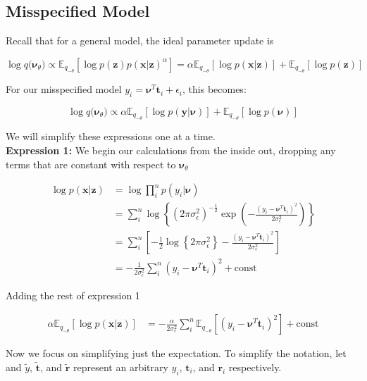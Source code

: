 \documentclass[letterpaper,12pt]{article}
\newcommand{\lc}{\left \{} %
\newcommand{\rc}{\right \}} %
\newcommand{\lp}{\left (} %
\newcommand{\rp}{\right )} %
\newcommand{\lb}{\left [} %
\newcommand{\rb}{\right ]} %
\newcommand{\pz}{\ensuremath{p(\boldsymbol{z})}}
\newcommand{\pxgivenz}{\ensuremath{p(\boldsymbol{x} | \boldsymbol{z})}}
\newcommand{\sigmaepsilon}{\sigma_\epsilon^2} %
\newcommand{\nuv}{\boldsymbol{\nu}} %
\newcommand{\ti}{\boldsymbol{t}_i} %
\newcommand{\ri}{\boldsymbol{r}_i} %
\newcommand{\ytilde}{\ensuremath{\tilde{y}}} %
\newcommand{\ttilde}{\ensuremath{\tilde{\boldsymbol{t}}}} %
\newcommand{\rtilde}{\ensuremath{\tilde{\boldsymbol{r}}}} %
\newcommand{\qtheta}{\ensuremath{q(\boldsymbol{\nu}_\theta})}
\newcommand{\nutheta}{\ensuremath{\nuv_\theta}} %
\newcommand{\Etheta}{\ensuremath{\mathbb{E}_{q_{-\theta}}}} %
\newcommand{\el}{\left[} %
\newcommand{\er}{\right]} %
\begin{document}
\subsection{Misspecified Model}
Recall that for a general model, the ideal parameter update is

\begin{equation}
    \log \qtheta \propto \Etheta \el \log \pz \pxgivenz^\alpha \er = \alpha \Etheta \el \log \pxgivenz \er +  \Etheta \el \log \pz \er
\end{equation}

For our misspecified model $y_i=\mathbf{\nu}^T\mathbf{t}_i+\epsilon_i$, this becomes:

\begin{equation}
    \log \qtheta \propto \alpha \Etheta \el \log p(\boldsymbol{y}|\nuv) \er +  \Etheta \el \log p(\nuv) \er
\end{equation}

We will simplify these expressions one at a time.
\\

\noindent \textbf{Expression 1:} We begin our calculations from the inside out, dropping any terms that are constant with respect to \nutheta

\begin{equation}
\begin{split}
    \log \pxgivenz &= \log \prod_i^n p(y_i|\nuv) \\
    &= \sum_i^n \log \lc (2\pi \sigmaepsilon )^{-\frac{1}{2}}  \exp \lp - \frac{\lp y_i - \nuv^T \ti \rp^2}{2 \sigmaepsilon} \rp \rc \\
    &= \sum_i^n \lb -\frac{1}{2} \log \lc 2\pi \sigmaepsilon \rc - \frac{\lp y_i - \nuv^T \ti \rp^2}{2 \sigmaepsilon} \rb \\
    &= - \frac{1}{2 \sigmaepsilon} \sum_i^n \lp y_i - \nuv^T \ti \rp ^2 + \text{const}
\end{split}
\end{equation}

Adding the rest of expression 1

\begin{equation}
\begin{split}
     \alpha \Etheta \el \log \pxgivenz \er &= -\frac{\alpha}{2 \sigmaepsilon} \sum_i^n \Etheta \lb \lp y_i - \nuv^T \ti \rp ^2  \rb  + \text{const}
\end{split}
\end{equation}

Now we focus on simplifying just the expectation. To simplify the notation, let and $\ytilde$, $\ttilde$, and $\rtilde$ represent an arbitrary $y_i$, $\ti$, and $\ri$ respectively.
\end{document}
